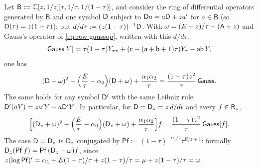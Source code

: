\begin{lem}
\label{lem:lea-op}
Let $\mathsf{B} := \mathbb{C}[z,1/z][\tau,1/\tau,1/(1-\tau)]$, and consider the ring of differential operators generated by $\mathsf{B}$ and one symbol $\mathsf{D}$ subject to $\mathsf{D} a = a\mathsf{D} + z a'$ for $a\in\mathsf{B}$ (so $\mathsf{D}(\tau) = z(1-\tau)$); put $d/d\tau := (z(1-\tau))^{-1}\mathsf{D}$. With $\omega = (E+z)/\tau - (\mathsf{A}+z)$ and Gauss's operator of \eqref{eq:row-gaussop}, written with this $d/d\tau$,
\[
\mathsf{Gauss}[Y] = \tau(1-\tau)Y_{\tau\tau} + (\mathsf{c} - (\mathsf{a}+\mathsf{b}+1)\tau)Y_\tau - \mathsf{a}\mathsf{b}\,Y,
\]
one has
\begin{equation}
\label{eq:lea-op}
(\mathsf{D}+\omega)^2 - \Bigl(\frac{E}{\tau}-\alpha_0\Bigr)(\mathsf{D}+\omega) + \frac{\alpha_1\alpha_2}{\tau} = \frac{(1-\tau)z^2}{\tau}\,\mathsf{Gauss} .
\end{equation}
The same holds for any symbol $\mathsf{D}'$ with the same Leibniz rule $\mathsf{D}'(aY) = z a'Y + a\mathsf{D}'Y$. In particular, for $\mathsf{D} = \mathsf{D}_{z} = z\,d/dt$ and every $f\in\mathsf{R}_{z}$,
\[
\Bigl[(\mathsf{D}_{z}+\omega)^2 - \Bigl(\frac{E}{\tau}-\alpha_0\Bigr)(\mathsf{D}_{z}+\omega) + \frac{\alpha_1\alpha_2}{\tau}\Bigr]f = \frac{(1-\tau)z^2}{\tau}\,\mathsf{Gauss}[f].
\]
The case $\mathsf{D} = \mathsf{D}_{z}$ is $\mathsf{D}_{z}$ conjugated by $\mathsf{Pf} := (1-\tau)^{-\alpha_1/z}\tau^{E/z+1}$: formally $\mathsf{D}_{z}(\mathsf{Pf}\,f) = \mathsf{Pf}\,(\mathsf{D}_{z}+\omega)f$, since $z(\log\mathsf{Pf})' = \alpha_1 + E(1-\tau)/\tau + z(1-\tau)/\tau = \mu + z(1-\tau)/\tau = \omega$.
\end{lem}

